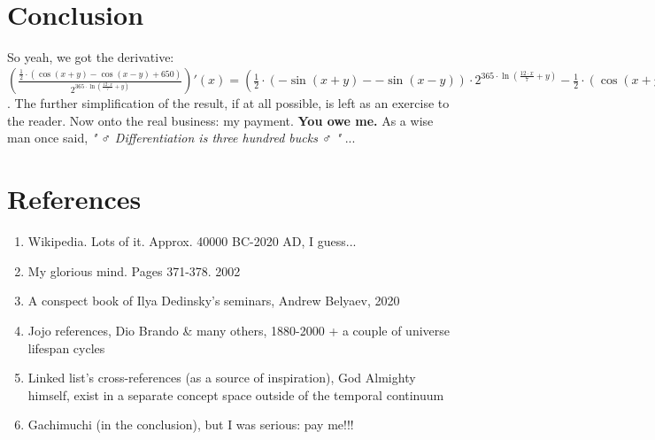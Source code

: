 \documentclass[12pt]{article}
\begin{document}
\begin{fleqn}[\parindent]
\section{\Large{Conclusion}}
So yeah, we got the derivative: 
$ (\frac{\frac{ 1 }{ 2 } \cdot (\cos ( x  +  y ) - \cos ( x  -  y ) +  650 )}{{ 2 }^{ 365  \cdot \ln (\frac{ 12  \cdot  x }{ 7 } +  y )}})'(x) = (\frac{ 1 }{ 2 } \cdot (- \sin ( x  +  y ) - - \sin ( x  -  y )) \cdot { 2 }^{ 365  \cdot \ln (\frac{ 12  \cdot  x }{ 7 } +  y )} - \frac{ 1 }{ 2 } \cdot (\cos ( x  +  y ) - \cos ( x  -  y ) +  650 ) \cdot \ln  2  \cdot { 2 }^{ 365  \cdot \ln (\frac{ 12  \cdot  x }{ 7 } +  y )} \cdot  365  \cdot \frac{\frac{ 84 }{ 49 }}{\frac{ 12  \cdot  x }{ 7 } +  y }) \div {({ 2 }^{ 365  \cdot \ln (\frac{ 12  \cdot  x }{ 7 } +  y )})}^{ 2 } $. 
The further simplification of the result, if at all possible, is left as an exercise to the reader.
Now onto the real business: my payment. \textbf{You owe me.}
As a wise man once said, \textit{" ♂ Differentiation is three hundred bucks ♂ "} ...
\section{\Large{References}}
\begin{enumerate}
\item Wikipedia. Lots of it. Approx. 40000 BC-2020 AD, I guess...
\item My glorious mind. Pages 371-378. 2002
\item A conspect book of Ilya Dedinsky's seminars, Andrew Belyaev, 2020
\item Jojo references, Dio Brando \& many others, 1880-2000 + a couple of universe lifespan cycles
\item Linked list's cross-references (as a source of inspiration), God Almighty himself, exist in a separate concept space outside of the temporal continuum
\item Gachimuchi (in the conclusion), but I was serious: pay me!!!
\end{enumerate}
\end{fleqn}
\end{document}

